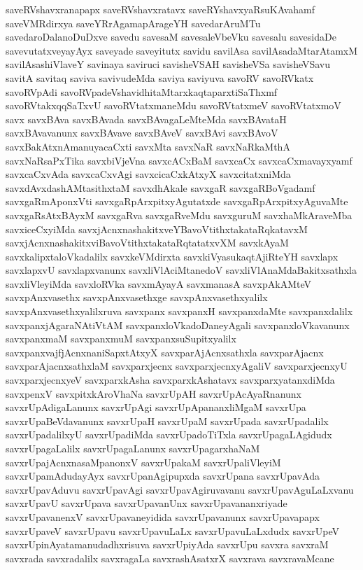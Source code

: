 {saveRVshavxranapapx
saveRVshavxratavx
saveRYshavxyaRsuKAvahamf
saveVMRdirxya
saveYRrAgamapArageYH
savedarAruMTu
savedaroDalanoDuDxve
savedu
savesaM
savesaleVbeVku
savesalu
savesidaDe
savevutatxveyayAyx
saveyade
saveyitutx
savidu
savilAsa
savilAsadaMtarAtamxM
savilAsashiVlaveY
savinaya
saviruci
savisheVSAH
savisheVSa
savisheVSavu
savitA
savitaq
saviva
savivudeMda
saviya
saviyuva
savoRV
savoRVkatx
savoRVpAdi
savoRVpadeVshavidhitaMtarxkaqtaparxtiSaThxmf
savoRVtakxqqSaTxvU
savoRVtatxmaneMdu
savoRVtatxmeV
savoRVtatxmoV
savx
savxBAva
savxBAvada
savxBAvagaLeMteMda
savxBAvataH
savxBAvavanunx
savxBAvave
savxBAveV
savxBAvi
savxBAvoV
savxBakAtxnAmanuyacaCxti
savxMta
savxNaR
savxNaRkaMthA
savxNaRsaPxTika
savxbiVjeVna
savxcACxBaM
savxcaCx
savxcaCxmavayxyamf
savxcaCxvAda
savxcaCxvAgi
savxcicaCxkAtxyX
savxcitatxniMda
savxdAvxdashAMtasithxtaM
savxdhAkale
savxgaR
savxgaRBoVgadamf
savxgaRmAponxVti
savxgaRpArxpitxyAgutatxde
savxgaRpArxpitxyAguvaMte
savxgaRsAtxBAyxM
savxgaRva
savxgaRveMdu
savxguruM
savxhaMkAraveMba
savxiceCxyiMda
savxjAcnxnashakitxveYBavoVtithxtakataRqkatavxM
savxjAcnxnashakitxviBavoVtithxtakataRqtatatxvXM
savxkAyaM
savxkalipxtaloVkadalilx
savxkeVMdirxta
savxkiVyasukaqtAjiRteYH
savxlapx
savxlapxvU
savxlapxvanunx
savxliVlAciMtanedoV
savxliVlAnaMdaBakitxsathxla
savxliVleyiMda
savxloRVka
savxmAyayA
savxmanasA
savxpAkAMteV
savxpAnxvasethx
savxpAnxvasethxge
savxpAnxvasethxyalilx
savxpAnxvasethxyalilxruva
savxpanx
savxpanxH
savxpanxdaMte
savxpanxdalilx
savxpanxjAgaraNAtiVtAM
savxpanxloVkadoDaneyAgali
savxpanxloVkavanunx
savxpanxmaM
savxpanxmuM
savxpanxsuSupitxyalilx
savxpanxvajfjAcnxnaniSapxtAtxyX
savxparAjAcnxsathxla
savxparAjacnx
savxparAjacnxsathxlaM
savxparxjecnx
savxparxjecnxyAgaliV
savxparxjecnxyU
savxparxjecnxyeV
savxparxkAsha
savxparxkAshatavx
savxparxyatanxdiMda
savxpenxV
savxpitxkAroVhaNa
savxrUpAH
savxrUpAcAyaRnanunx
savxrUpAdigaLanunx
savxrUpAgi
savxrUpApananxliMgaM
savxrUpa
savxrUpaBeVdavanunx
savxrUpaH
savxrUpaM
savxrUpada
savxrUpadalilx
savxrUpadalilxyU
savxrUpadiMda
savxrUpadoTiTxla
savxrUpagaLAgidudx
savxrUpagaLalilx
savxrUpagaLanunx
savxrUpagarxhaNaM
savxrUpajAcnxnasaMpanonxV
savxrUpakaM
savxrUpaliVleyiM
savxrUpamAdudayAyx
savxrUpanAgipupxda
savxrUpana
savxrUpavAda
savxrUpavAduvu
savxrUpavAgi
savxrUpavAgiruvavanu
savxrUpavAguLaLxvanu
savxrUpavU
savxrUpava
savxrUpavanUnx
savxrUpavananxriyade
savxrUpavanenxV
savxrUpavaneyidida
savxrUpavanunx
savxrUpavapapx
savxrUpaveV
savxrUpavu
savxrUpavuLaLx
savxrUpavuLaLxdudx
savxrUpeV
savxrUpinAyatamanudadhxrisuva
savxrUpiyAda
savxrUpu
savxra
savxraM
savxrada
savxradalilx
savxragaLa
savxrashAsatxrX
savxrava
savxravaMcane
}
